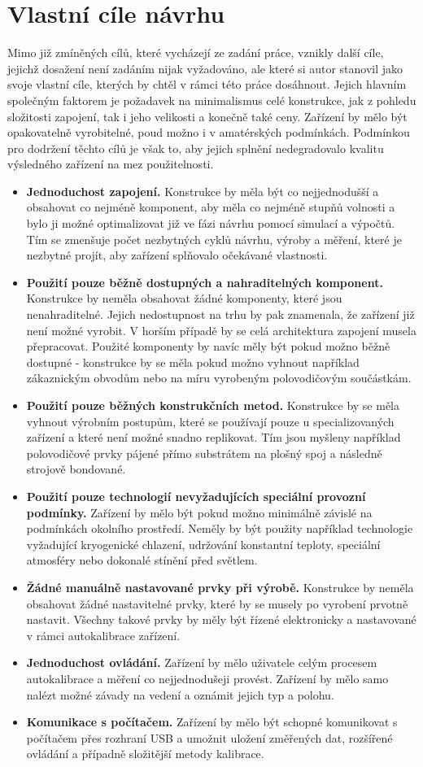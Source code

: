\section{Vlastní cíle návrhu}
Mimo již zmíněných cílů, které vycházejí ze zadání práce, vznikly další cíle, jejichž dosažení není zadáním nijak vyžadováno, ale které si autor stanovil jako svoje vlastní cíle, kterých by chtěl v rámci této práce dosáhnout. Jejich hlavním společným faktorem je požadavek na minimalismus celé konstrukce, jak z pohledu složitosti zapojení, tak i jeho velikosti a konečně také ceny. Zařízení by mělo být opakovatelně vyrobitelné, poud možno i v amatérských podmínkách. Podmínkou pro dodržení těchto cílů je však to, aby jejich splnění nedegradovalo kvalitu výsledného zařízení na mez použitelnosti.
\begin{itemize}
\item \textbf{Jednoduchost zapojení.} Konstrukce by měla být co nejjednodušší a obsahovat co nejméně komponent, aby měla co nejméně stupňů volnosti a bylo ji možné optimalizovat již ve fázi návrhu pomocí simulací a výpočtů. Tím se zmenšuje počet nezbytných cyklů návrhu, výroby a měření, které je nezbytné projít, aby zařízení splňovalo očekávané vlastnosti.
\item \textbf{Použití pouze běžně dostupných a nahraditelných komponent.} Konstrukce by neměla obsahovat žádné komponenty, které jsou nenahraditelné. Jejich nedostupnost na trhu by pak znamenala, že zařízení již není možné vyrobit. V horším případě by se celá architektura zapojení musela přepracovat. Použité komponenty by navíc měly být pokud možno běžně dostupné - konstrukce by se měla pokud možno vyhnout například zákaznickým obvodům nebo na míru vyrobeným polovodičovým součástkám.
\item \textbf{Použití pouze běžných konstrukčních metod.} Konstrukce by se měla vyhnout výrobním postupům, které se používají pouze u specializovaných zařízení a které není možné snadno replikovat. Tím jsou myšleny například polovodičové prvky pájené přímo substrátem na plošný spoj a následně strojově bondované.
\item \textbf{Použití pouze technologií nevyžadujících speciální provozní podmínky.} Zařízení by mělo být pokud možno minimálně závislé na podmínkách okolního prostředí. Neměly by být použity například technologie vyžadující kryogenické chlazení, udržování konstantní teploty, speciální atmosféry nebo dokonalé stínění před světlem.
\item \textbf{Žádné manuálně nastavované prvky při výrobě.} Konstrukce by neměla obsahovat žádné nastavitelné prvky, které by se musely po vyrobení prvotně nastavit. Všechny takové prvky by měly být řízené elektronicky a nastavované v rámci autokalibrace zařízení.
\item \textbf{Jednoduchost ovládání.} Zařízení by mělo uživatele celým procesem autokalibrace a měření co nejjednodušeji provést. Zařízení by mělo samo nalézt možné závady na vedení a oznámit jejich typ a polohu.
\item \textbf{Komunikace s počítačem.} Zařízení by mělo být schopné komunikovat s počítačem přes rozhraní USB a umožnit uložení změřených dat, rozšířené ovládání a případně složitější metody kalibrace.
\end{itemize}
